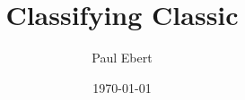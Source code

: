 \documentclass{article}
\begin{document}
\title{Classifying Classic}

\author{Paul Ebert}

\date{\today}

\maketitle

\tableofcontents













\printbibliography
\end{document}
